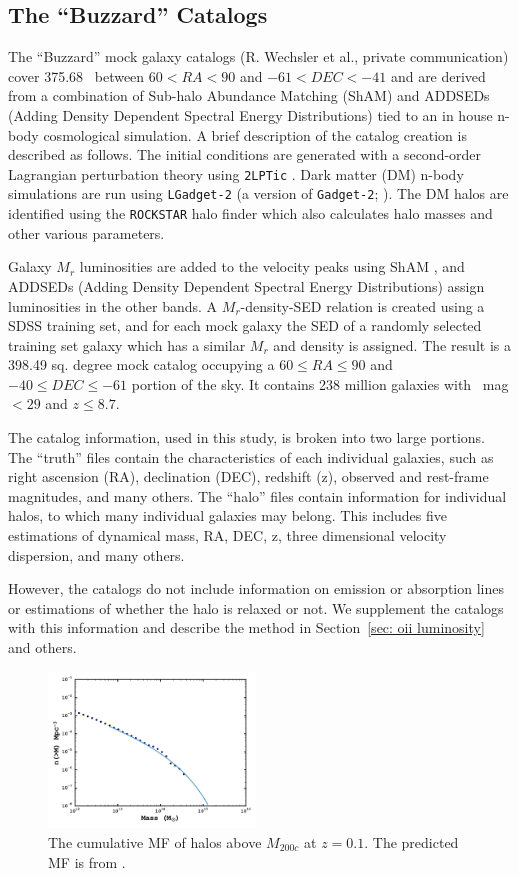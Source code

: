 \documentclass[apj, revtex4]{emulateapj}
\begin{document}
\subsection{The ``Buzzard'' Catalogs}
The ``Buzzard'' mock galaxy catalogs (R. Wechsler et al., private communication) cover 375.68 \degsq\ between $60 < RA < 90$ and $-61 < DEC < -41$ and are derived from a combination of Sub-halo Abundance Matching (ShAM) and ADDSEDs (Adding Density Dependent Spectral Energy Distributions) tied to an in house n-body cosmological simulation. A brief description of the catalog creation is described as follows. The initial conditions are generated with a second-order Lagrangian perturbation theory using {\tt 2LPTic} \citep{Crocce2006}. Dark matter (DM) n-body simulations are run using {\tt LGadget-2} (a version of {\tt Gadget-2}; \citealt{Springel2005}). The DM halos are identified using the {\tt ROCKSTAR} halo finder \citep{Behroozi2013} which also calculates halo masses and other various parameters. 

Galaxy $M_r$ luminosities are added to the velocity peaks using ShAM \citep{Reddick2013}, and ADDSEDs (Adding Density Dependent Spectral Energy Distributions) assign luminosities in the other bands. A $M_r$-density-SED relation is created using a SDSS training set, and for each mock galaxy the SED of a randomly selected training set galaxy which has a similar $M_r$ and density is assigned. The result is a 398.49 sq. degree mock catalog occupying a $60 \leq RA \leq 90$ and $-40 \leq DEC \leq -61$ portion of the sky. It contains 238 million galaxies with \sdssr\ mag $< 29$ and $z \leq 8.7$.

The catalog information, used in this study, is broken into two large portions. The ``truth'' files contain the characteristics of each individual galaxies, such as right ascension (RA), declination (DEC), redshift (z), observed and rest-frame magnitudes, and many others. The ``halo'' files contain information for individual halos, to which many individual galaxies may belong. This includes five estimations of dynamical mass, RA, DEC, z, three dimensional velocity dispersion, and many others.

However, the catalogs do not include information on emission or absorption lines or estimations of whether the halo is relaxed or not. We supplement the catalogs with this information and describe the method in Section~\ref{sec: oii luminosity} and others.

\begin{figure} 
	\includegraphics[width=0.49\textwidth]{hmf.pdf} 
	\caption{The cumulative MF of halos above $M_{200c}$ at $z=0.1$. The predicted MF is from \cite{Tinker2008}.} 
	\label{fig: hmf} 
\end{figure}
\end{document}
